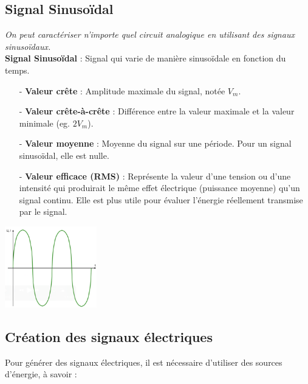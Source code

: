 \subsection{Signal Sinusoïdal}
\textit{On peut caractériser n'importe quel circuit analogique en utilisant des signaux sinusoïdaux.} \\
\textbf{Signal Sinusoïdal} : Signal qui varie de manière sinusoïdale en fonction du temps.

\begin{itemize}
    \item[-] \textbf{Valeur crête} : Amplitude maximale du signal, notée \( V_m \).
    \item[-] \textbf{Valeur crête-à-crête} : Différence entre la valeur maximale et la valeur minimale (eg. \( 2V_m \)).
    \item[-] \textbf{Valeur moyenne} : Moyenne du signal sur une période. Pour un signal sinusoïdal, elle est nulle.
    \item[-] \textbf{Valeur efficace (RMS)} : Représente la valeur d'une tension ou d'une intensité qui produirait le même effet électrique (puissance moyenne) qu'un signal continu. Elle est plus utile pour évaluer l'énergie réellement transmise par le signal.
\end{itemize}

\begin{center}
    \includegraphics[width=0.3\textwidth]{chapters/chapter1/images/sinus.png}
\end{center}

\subsection{Création des signaux électriques}

Pour générer des signaux électriques, il est nécessaire d'utiliser des sources d'énergie, à savoir :

